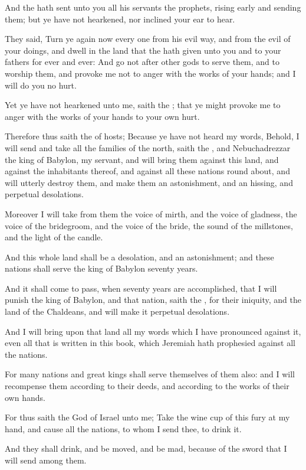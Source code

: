 \verse And the \LORD hath sent unto you all his servants the prophets, rising early and sending them; but ye have not hearkened, nor inclined your ear to hear.

\verse They said, Turn ye again now every one from his evil way, and from the evil of your doings, and dwell in the land that the \LORD hath given unto you and to your fathers for ever and ever: \verse And go not after other gods to serve them, and to worship them, and provoke me not to anger with the works of your hands; and I will do you no hurt.

\verse Yet ye have not hearkened unto me, saith the \LORD; that ye might provoke me to anger with the works of your hands to your own hurt.

\verse Therefore thus saith the \LORD of hosts; Because ye have not heard my words, \verse Behold, I will send and take all the families of the north, saith the \LORD, and Nebuchadrezzar the king of Babylon, my servant, and will bring them against this land, and against the inhabitants thereof, and against all these nations round about, and will utterly destroy them, and make them an astonishment, and an hissing, and perpetual desolations.

\verse Moreover I will take from them the voice of mirth, and the voice of gladness, the voice of the bridegroom, and the voice of the bride, the sound of the millstones, and the light of the candle.

\verse And this whole land shall be a desolation, and an astonishment; and these nations shall serve the king of Babylon seventy years.

\verse And it shall come to pass, when seventy years are accomplished, that I will punish the king of Babylon, and that nation, saith the \LORD, for their iniquity, and the land of the Chaldeans, and will make it perpetual desolations.

\verse And I will bring upon that land all my words which I have pronounced against it, even all that is written in this book, which Jeremiah hath prophesied against all the nations.

\verse For many nations and great kings shall serve themselves of them also: and I will recompense them according to their deeds, and according to the works of their own hands.

\verse For thus saith the \LORD God of Israel unto me; Take the wine cup of this fury at my hand, and cause all the nations, to whom I send thee, to drink it.

\verse And they shall drink, and be moved, and be mad, because of the sword that I will send among them.

